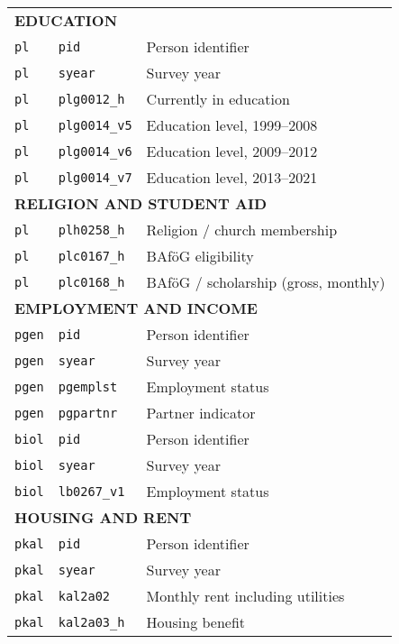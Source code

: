 {\begin{longtable}{lll}
\midrule
\multicolumn{3}{l}{\textbf{EDUCATION}} \\
\texttt{pl} & \texttt{pid} & Person identifier \\
\texttt{pl} & \texttt{syear} & Survey year \\
\texttt{pl} & \texttt{plg0012\_h} & Currently in education \\
\texttt{pl} & \texttt{plg0014\_v5} & Education level, 1999--2008 \\
\texttt{pl} & \texttt{plg0014\_v6} & Education level, 2009--2012 \\
\texttt{pl} & \texttt{plg0014\_v7} & Education level, 2013--2021 \\

\midrule
\multicolumn{3}{l}{\textbf{RELIGION AND STUDENT AID}} \\
\texttt{pl} & \texttt{plh0258\_h} & Religion / church membership \\
\texttt{pl} & \texttt{plc0167\_h} & BAföG eligibility \\
\texttt{pl} & \texttt{plc0168\_h} & BAföG / scholarship (gross, monthly) \\

\midrule
\multicolumn{3}{l}{\textbf{EMPLOYMENT AND INCOME}} \\
\texttt{pgen} & \texttt{pid} & Person identifier \\
\texttt{pgen} & \texttt{syear} & Survey year \\
\texttt{pgen} & \texttt{pgemplst} & Employment status \\
\texttt{pgen} & \texttt{pgpartnr} & Partner indicator \\
\texttt{biol} & \texttt{pid} & Person identifier \\
\texttt{biol} & \texttt{syear} & Survey year \\
\texttt{biol} & \texttt{lb0267\_v1} & Employment status \\

\midrule
\multicolumn{3}{l}{\textbf{HOUSING AND RENT}} \\
\texttt{pkal} & \texttt{pid} & Person identifier \\
\texttt{pkal} & \texttt{syear} & Survey year \\
\texttt{pkal} & \texttt{kal2a02} & Monthly rent including utilities \\
\texttt{pkal} & \texttt{kal2a03\_h} & Housing benefit \\


\end{longtable}}
